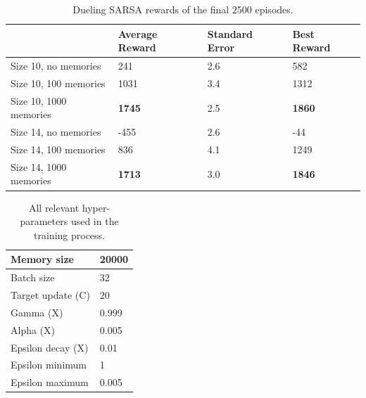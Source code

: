 \begin{table}[H]
\begin{tabular}{l|l|l|l|}
\cline{2-4}
\textbf{} & Average Reward & Standard Error & Best Reward \\ \hline
\multicolumn{1}{|l|}{Size 10, no memories} & 241 & 2.6 & 582 \\ \hline
\multicolumn{1}{|l|}{Size 10, 100 memories} & 1031 & 3.4 & 1312 \\ \hline
\multicolumn{1}{|l|}{Size 10, 1000 memories} & \textbf{1745} & 2.5 & \textbf{1860} \\ \hline
\multicolumn{1}{|l|}{Size 14, no memories} & -455 & 2.6 & -44 \\ \hline
\multicolumn{1}{|l|}{Size 14, 100 memories} & 836 & 4.1 & 1249 \\ \hline
\multicolumn{1}{|l|}{Size 14, 1000 memories} & \textbf{1713} & 3.0 & \textbf{1846} \\ \hline
\end{tabular}
\caption{Dueling SARSA rewards of the final 2500 episodes.}
\label{tab:2500both}
\end{table}


\begin{table}[H]
\begin{tabular}{|l|l|}
\hline
Memory size & 20000 \\ \hline
Batch size & 32 \\ \hline
Target update (C) & 20 \\ \hline
Gamma (X) & 0.999 \\ \hline
Alpha (X) & 0.005 \\ \hline
Epsilon decay (X) & 0.01 \\ \hline
Epsilon minimum & 1 \\ \hline
Epsilon maximum & 0.005 \\ \hline
\end{tabular}
\caption{All relevant hyper-parameters used in the training process.}
\label{tab:hyperparameters}
\end{table}


\clearpage
